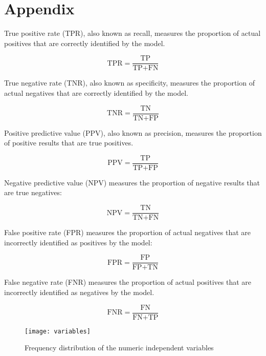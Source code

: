 \newpage

\renewcommand{\thetable}{A\arabic{table}}
\renewcommand{\thefigure}{A\arabic{figure}}

\setcounter{table}{0}
\setcounter{figure}{0}


\section*{Appendix}\label{appendix}




True positive rate (TPR), also known as recall, measures the proportion of actual positives that are correctly identified by the model.

\begin{equation}
\text{TPR} = \frac{\text{TP}}{\text{TP} + \text{FN}}
\end{equation}

True negative rate (TNR), also known as specificity, measures the proportion of actual negatives that are correctly identified by the model.

\begin{equation}
\text{TNR} = \frac{\text{TN}}{\text{TN} + \text{FP}}
\end{equation}

Positive predictive value (PPV), also known as precision, measures the proportion of positive results that are true positives.

\begin{equation}
\text{PPV} = \frac{\text{TP}}{\text{TP} + \text{FP}}
\end{equation}

Negative predictive value (NPV) measures the proportion of negative results that are true negatives: 

\begin{equation}
\text{NPV} = \frac{\text{TN}}{\text{TN} + \text{FN}}
\end{equation}

False positive rate (FPR) measures the proportion of actual negatives that are incorrectly identified as positives by the model:

\begin{equation}
\text{FPR} = \frac{\text{FP}}{\text{FP} + \text{TN}}
\end{equation}

False negative rate (FNR) measures the proportion of actual positives that are incorrectly identified as negatives by the model.

\begin{equation}
    \text{FNR} = \frac{\text{FN}}{\text{FN} + \text{TP}}
\end{equation}





\begin{figure}[H]
    \centering  
    \texttt{[image: variables]}
    \caption{Frequency distribution of the numeric independent variables}
    \label{fig:variable}
\end{figure}
